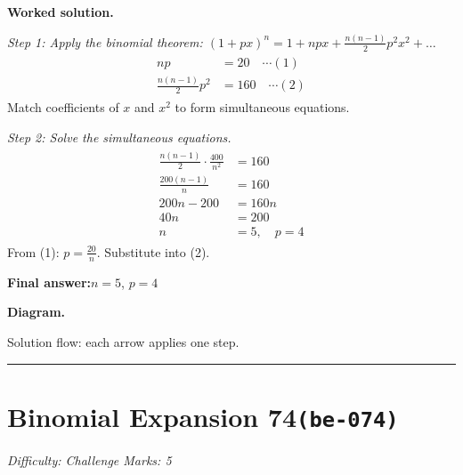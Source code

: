 \documentclass[11pt]{article}
\begin{document}
\textbf{Worked solution.}

\textit{Step 1: Apply the binomial theorem: \((1+px)^n = 1 + npx + \frac{n(n-1)}{2}p^2x^2 + \ldots\)}
\[\begin{gathered}
\begin{aligned} np &= 20 \quad \cdots (1) \\ \frac{n(n-1)}{2}p^2 &= 160 \quad \cdots (2) \end{aligned}
\end{gathered}\]
Match coefficients of \(x\) and \(x^2\) to form simultaneous equations.

\textit{Step 2: Solve the simultaneous equations.}
\[\begin{gathered}
\begin{aligned} \frac{n(n-1)}{2} \cdot \frac{400}{n^2} &= 160 \\ \frac{200(n-1)}{n} &= 160 \\ 200n - 200 &= 160n \\ 40n &= 200 \\ n &= 5,\quad p = 4 \end{aligned}
\end{gathered}\]
From (1): \(p = \frac{20}{n}\). Substitute into (2).

\begin{answerbox}
\textbf{Final answer:}\quad \(\displaystyle n = 5\), \(\displaystyle p = 4\)
\end{answerbox}
\textbf{Diagram.}

\begin{center}
\end{center}
\small Solution flow: each arrow applies one step.\normalsize

\medskip\hrule

\section*{Binomial Expansion 74\quad\small\texttt{(be-074)}}
\textit{Difficulty: Challenge \quad\textbar\quad Marks: 5}
\end{document}
